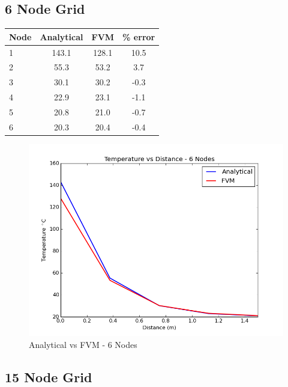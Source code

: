 \documentclass[review]{elsarticle}
\begin{document}
\subsection{6 Node Grid}
\begin{center}
  \begin{tabular}{| l | c | c | c |}
    \hline
    Node & Analytical & FVM & \% error \\ \hline
    1 & 143.1 & 128.1 & 10.5 \\
    2 & 55.3 & 53.2 & 3.7 \\
    3 & 30.1 & 30.2 & -0.3 \\
    4 & 22.9 & 23.1 & -1.1 \\ 
    5 & 20.8 & 21.0 & -0.7 \\
    6 & 20.3 & 20.4 & -0.4 \\
    \hline
  \end{tabular}
\end{center}

\begin{figure}[H]
    \includegraphics[width=\textwidth]{img/6_nodes_avsf.png}
    \caption{Analytical vs FVM - 6 Nodes}
    \label{6nodes}
\end{figure}

\subsection{15 Node Grid}
\end{document}
